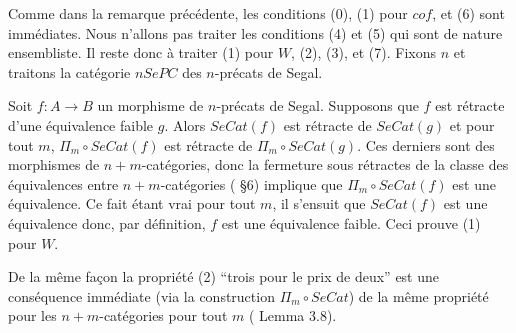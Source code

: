 \documentclass[12pt]{article}
\begin{document}
Comme dans la remarque pr\'ec\'edente, les conditions (0), (1) pour $cof$,
et (6) sont imm\'ediates. Nous n'allons pas traiter les conditions (4) et (5)
qui sont de nature ensembliste. Il reste donc \`a traiter (1) pour
$W$, (2), (3), et (7). Fixons $n$ et traitons la cat\'egorie $nSePC$ des
$n$-pr\'ecats de Segal.

Soit $f:A\rightarrow B$ un morphisme de $n$-pr\'ecats de Segal.
Supposons que $f$ est r\'etracte d'une \'equivalence faible $g$.  Alors
$SeCat(f)$ est r\'etracte de $SeCat(g)$ et pour tout $m$, $\Pi _m \circ
SeCat(f)$ est r\'etracte de $\Pi _m \circ SeCat(g)$. Ces derniers sont
des morphismes de $n+m$-cat\'egories, donc la fermeture sous r\'etractes de la
classe des \'equivalences entre $n+m$-cat\'egories  (\cite{nCAT} \S 6) implique
que $\Pi _m \circ SeCat(f)$ est une \'equivalence. Ce fait \'etant vrai
pour tout $m$, il
s'ensuit que $SeCat(f)$ est une \'equivalence donc, par d\'efinition, $f$ est
une \'equivalence faible. Ceci prouve (1) pour $W$.

De la m\^eme fa\c{c}on la propri\'et\'e (2) ``trois pour le prix de deux''
est une cons\'equence imm\'ediate (via la construction $\Pi _m\circ SeCat$)
de la m\^eme propri\'et\'e pour les $n+m$-cat\'egories pour tout $m$
(\cite{nCAT} Lemma 3.8).
\end{document}
